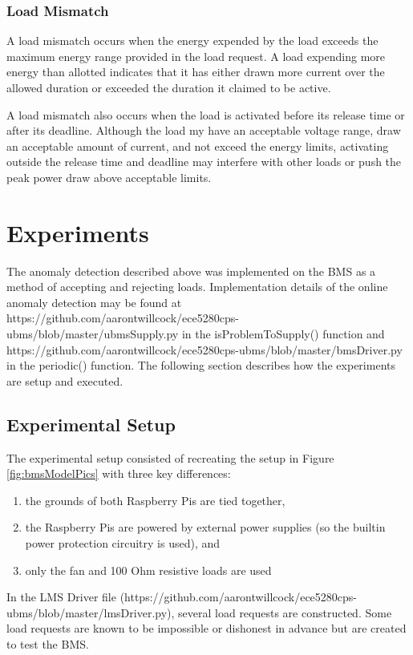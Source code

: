 \documentclass[11pt,conference,draftcls,onecolumn]{IEEEtran}
\begin{document}
\subsubsection{Load Mismatch}
A load mismatch occurs when the energy expended by the load exceeds the maximum energy range provided in the load request.
A load expending more energy than allotted indicates that it has either drawn more current over the allowed duration or exceeded the duration it claimed to be active.

A load mismatch also occurs when the load is activated before its release time or after its deadline. 
Although the load my have an acceptable voltage range, draw an acceptable amount of current, and not exceed the energy limits, activating outside the release time and deadline may interfere with other loads or push the peak power draw above acceptable limits.


\section{Experiments}\label{sec:experiments}
The anomaly detection described above was implemented on the BMS as a method of accepting and rejecting loads.
Implementation details of the online anomaly detection may be found at https://github.com/aarontwillcock/ece5280cps-ubms/blob/master/ubmsSupply.py in the isProblemToSupply() function and https://github.com/aarontwillcock/ece5280cps-ubms/blob/master/bmsDriver.py in the periodic() function.  
The following section describes how the experiments are setup and executed.

\subsection{Experimental Setup}
The experimental setup consisted of recreating the setup in Figure \ref{fig:bmsModelPics} with three key differences:
\begin{enumerate}
    \item the grounds of both Raspberry Pis are tied together,
    \item the Raspberry Pis are powered by external power supplies (so the builtin power protection circuitry is used), and
    \item only the fan and 100 Ohm resistive loads are used
\end{enumerate}

In the LMS Driver file (https://github.com/aarontwillcock/ece5280cps-ubms/blob/master/lmsDriver.py), several load requests are constructed.
Some load requests are known to be impossible or dishonest in advance but are created to test the BMS.
\end{document}
